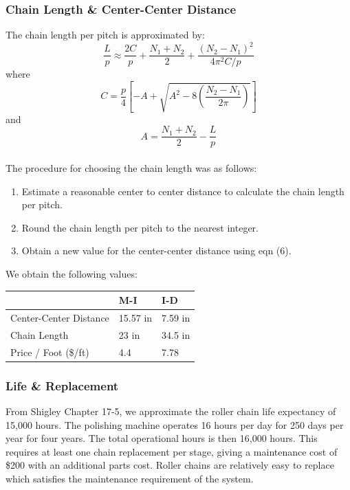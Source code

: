 \documentclass[letterpaper,12pt]{article}
\begin{document}
\subsubsection{Chain Length \& Center-Center Distance}
The chain length per pitch is approximated by:
\begin{equation}
\frac{L}{p} \approx \frac{2C}{p} + \frac{N_1 + N_2}{2} + \frac{(N_2 - N_1)^2}{4 \pi^2 C/p}
\end{equation}
where
\begin{equation}
    C = \frac{p}{4}\left[-A + \sqrt{A^2 - 8\left(\frac{N_2 - N_1}{2 \pi}\right)}\right]
\end{equation}
and
\begin{equation}
    A = \frac{N_1 + N_2}{2} - \frac{L}{p}
\end{equation}
\\
The procedure for choosing the chain length was as follows:
\begin{enumerate}
    \itemsep0em
    \item Estimate a reasonable center to center distance to calculate the chain length per pitch.
    \item Round the chain length per pitch to the nearest integer.
    \item Obtain a new value for the center-center distance using eqn (6).
\end{enumerate}
We obtain the following values:

\begin{center}
	\begin{tabular}{|p{4cm}|p{1.5cm}|p{1.5cm}| }
		\hline
		& M-I & I-D \\
		\hline
		Center-Center Distance & 15.57 in & 7.59 in\\
		Chain Length & 23 in & 34.5 in\\
		Price / Foot (\$/ft) & 4.4 & 7.78\\
		\hline
	\end{tabular}
\end{center}

\subsubsection{Life \& Replacement}
From Shigley Chapter 17-5, we approximate the roller chain life expectancy of 15,000 hours. The polishing machine operates 16 hours per day for 250 days per year for four years. The total operational hours is then 16,000 hours. This requires at least one chain replacement per stage, giving a maintenance cost of \$200 with an additional parts cost. Roller chains are relatively easy to replace which satisfies the maintenance requirement of the system. 
\end{document}
